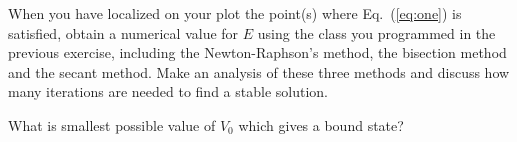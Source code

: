 \begin{prob}
When you have localized on your plot the point(s) where Eq.\ (\ref{eq:one}) 
is satisfied, obtain a numerical value for $E$ using the class you programmed in the 
previous exercise, including the 
Newton-Raphson's method, the bisection method and the secant method.
Make an analysis of these three methods and discuss how many iterations
are needed to find a stable solution.

What is smallest possible value of $V_0$ which  gives a bound state? 
\end{prob}






